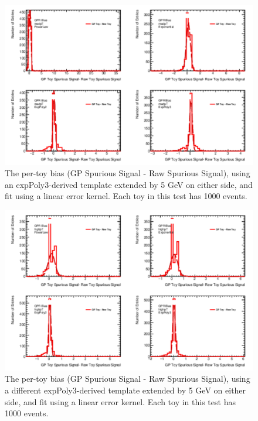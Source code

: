 \begin{figure} 
\begin{center}
  \includegraphics[width=\textwidth]{figures/background/gpr/validation/linear/ToyTest_FitSigBiases_medpT_1000_noSig}   
\caption{The per-toy bias (GP Spurious Signal - Raw Spurious Signal), using an expPoly3-derived template extended by 5 GeV on either side, and fit using a linear error kernel. Each toy in this test has 1000 events.}
\label{fig:bias_linearkernel_medpt_1000_noSig}
\end{center}
\end{figure}

\begin{figure} 
\begin{center}
  \includegraphics[width=\textwidth]{figures/background/gpr/validation/linear/ToyTest_FitSigBiases_highpT_1000_noSig}   
\caption{The per-toy bias (GP Spurious Signal - Raw Spurious Signal), using a different expPoly3-derived template extended by 5 GeV on either side, and fit using a linear error kernel. Each toy in this test has 1000 events.}
\label{fig:bias_linearkernel_highpt_1000_noSig}
\end{center}
\end{figure}

